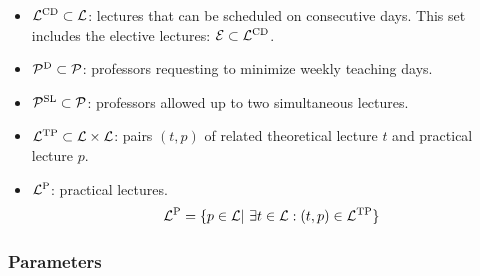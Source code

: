 \begin{itemize}
            \item $\mathcal{L}^\text{CD}\subset\mathcal{L}$: lectures that can be scheduled on consecutive days. This set includes the elective lectures: $\mathcal{E}\subset\mathcal{L}^\text{CD}$.
            \item $\mathcal{P}^\text{D}\subset\mathcal{P}$: professors requesting to minimize weekly teaching days.
            \item $\mathcal{P}^\text{SL}\subset\mathcal{P}$: professors allowed up to two simultaneous lectures.
            \item $\mathcal{L}^\text{TP}\subset \mathcal{L} \times \mathcal{L}$: pairs  $(t,p)$ of related theoretical lecture $t$ and practical lecture $p$.
            \item $\mathcal{L}^\text{P}$: practical lectures.
            \begin{equation}
                \mathcal{L}^\text{P} = \{p \in \mathcal{L} | \ \exists t \in\mathcal{L}: (t,p)\in \mathcal{L}^\text{TP} \}
                \nonumber
            \end{equation}
        \end{itemize}


    






    
    

    
    \subsubsection{Parameters}

    \newcommand{\overlap}[2]{\Omega_{#1,#2}}
    \newcommand{\maxHours}[1]{\overline{H}_{#1}}
    \newcommand{\minHours}[1]{\underline{H}_{#1}}
    \newcommand{\preference}{\Pi}
    \newcommand{\unav}{\Pi^0}
    \newcommand{\numLectures}{\overline{L}}
    \newcommand{\numProfs}{\overline{P}}
    
